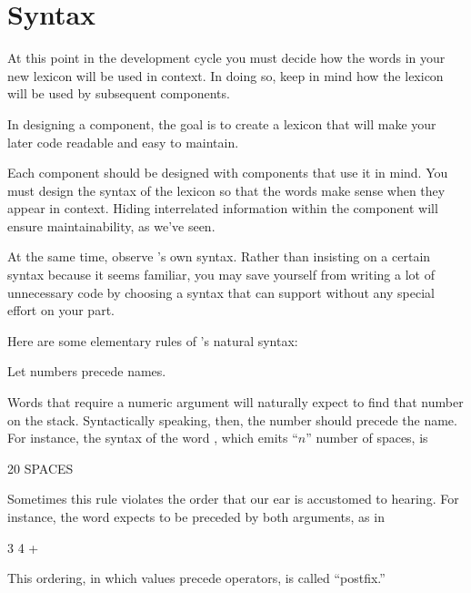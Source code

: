 \section{\Forth{} Syntax}%
%
%

At this point in the development cycle you must decide how the words in
your new lexicon will be used in context. In doing so, keep in mind how
the lexicon will be used by subsequent components.

\begin{tip}
In designing a component, the goal is to create a lexicon that will make your
later code readable and easy to maintain.
\end{tip}
Each component should be designed with components that use it in mind.
You must design the syntax of the lexicon so that the words make sense
when they appear in context. Hiding interrelated information within the
component will ensure maintainability, as we've seen.

At the same time, observe \Forth{}'s own syntax. Rather than insisting
on a certain syntax because it seems familiar, you may save
yourself from writing a lot of unnecessary code by choosing a syntax that
\Forth{} can support without any special effort on your part.

Here are some elementary rules of \Forth{}'s natural syntax:

\begin{tip}
Let numbers precede names.
\end{tip}
Words that require a numeric argument will naturally expect to find that
number on the stack. Syntactically speaking, then, the number should
precede the name. For instance, the syntax of the word , which
emits ``$n$'' number of spaces, is

\begin{Code}
20 SPACES
\end{Code}
Sometimes this rule violates the order that our ear is accustomed to
hearing. For instance, the \Forth{} word \forth{+} expects to be preceded
by both arguments, as in

\begin{Code}
3 4 +
\end{Code}
This ordering, in which values precede operators, is called ``postfix.''

